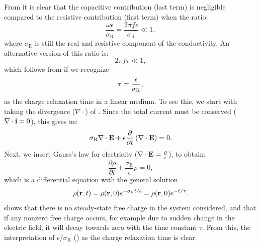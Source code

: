 \subsection{}
\label{sec:Sigma:Estimates}
From  it is clear that the capacitive contribution (last term) 
is negligible compared to the resistive contribution (first term) when the ratio:
\begin{equation}
\frac{\omega \epsilon}{\sigma_\text{R}} = \frac{2 \pi f \epsilon}{\sigma_\text{R}}  \ll 1,
\label{eq:Sigma:ratiocondition}
\end{equation}
where $\sigma_\text{R}$ is still the real and resistive component of the conductivity. 
An alternative version of this ratio is:
\begin{equation}
2 \pi f \tau \ll 1, 
\label{eq:Sigma:ratiocondition2}
\end{equation}
which follows from  if we recognize
\begin{equation}
\tau = \frac{\epsilon}{\sigma_\text{R}}, 
\label{eq:Sigma:chargerelaxationtime}
\index{Charge-relaxation} 
\end{equation}
as the charge relaxation time in a linear medium. To see this, we start with taking the divergence ($\nabla\cdot$) of . Since the total current must be conserved ($\nabla\cdot{\bf i} = 0$), this gives us:
\begin{equation}
\sigma_\text{R}\nabla\cdot{\bf E} +  \epsilon \frac{\partial}{\partial t}\left(\nabla\cdot {\bf E}\right) = 0.
\label{eq:Sigma:OnTheRoadAgain}
\end{equation}
Next, we insert Gauss's law for electricity (${\bf \nabla}\cdot {\bf E} = \frac{\rho}{\epsilon}$), to obtain:
\begin{equation}
\frac{\partial \rho}{\partial t} + \frac{\sigma_\mathrm{R}}{\epsilon} \rho = 0,
\label{eq:Sigma:OhmicConcervation2}
\end{equation}
which is a differential equation with the general solution
\begin{equation}
\rho({\bf r}, t) = \rho({\bf r}, 0)e^{-\sigma_\mathrm{R}t/\epsilon} = \rho({\bf r}, 0)e^{-t/\tau}.
\label{eq:Sigma:relax}
\end{equation}
 shows that there is no steady-state free charge in the system considered, 
and that if any nonzero free charge occurs, for example due to sudden change in the electric field, 
it will decay towards zero with the time constant $\tau$. 
From this, the interpretation of $\epsilon/\sigma_\mathrm{R}$ () 
as the charge relaxation time is clear. 

